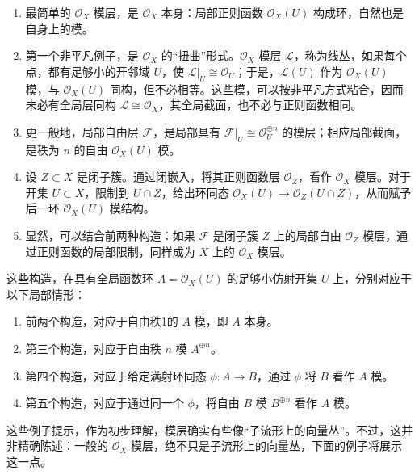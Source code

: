 \begin{example}\label{ex:4.40}
\begin{enumerate}[label=(\arabic*)]
\item 最简单的 $\mathcal{O}_X$ 模层，是 $\mathcal{O}_X$ 本身：局部正则函数 $\mathcal{O}_X(U)$ 构成环，自然也是自身上的模。
\item 第一个非平凡例子，是 $\mathcal{O}_X$ 的“扭曲”形式。$\mathcal{O}_X$ 模层 $\mathcal{L}$，称为线丛，如果每个点，都有足够小的开邻域 $U$，使 $\mathcal{L}|_U\cong\mathcal{O}_U$；于是，$\mathcal{L}(U)$ 作为 $\mathcal{O}_X(U)$ 模，与 $\mathcal{O}_X(U)$ 同构，但不必相等。这些模，可以按非平凡方式粘合，因而未必有全局层同构 $\mathcal{L}\cong\mathcal{O}_X$，其全局截面，也不必与正则函数相同。
\item 更一般地，局部自由层 $\mathcal{F}$，是局部具有 $\mathcal{F}|_U\cong\mathcal{O}_U^{\oplus n}$ 的模层；相应局部截面，是秩为 $n$ 的自由 $\mathcal{O}_X(U)$ 模。
\item 设 $Z\subset X$ 是闭子簇。通过闭嵌入，将其正则函数层 $\mathcal{O}_Z$，看作 $\mathcal{O}_X$ 模层。对于开集 $U\subset X$，限制到 $U\cap Z$，给出环同态 $\mathcal{O}_X(U)\to\mathcal{O}_Z(U\cap Z)$，从而赋予后一环 $\mathcal{O}_X(U)$ 模结构。
\item 显然，可以结合前两种构造：如果 $\mathcal{F}$ 是闭子簇 $Z$ 上的局部自由 $\mathcal{O}_Z$ 模层，通过正则函数的局部限制，同样成为 $X$ 上的 $\mathcal{O}_X$ 模层。
\end{enumerate}
\end{example}

这些构造，在具有全局函数环 $A=\mathcal{O}_X(U)$ 的足够小仿射开集 $U$ 上，分别对应于以下局部情形：
\begin{enumerate}[label=(\arabic*)]
\item 前两个构造，对应于自由秩1的 $A$ 模，即 $A$ 本身。
\item 第三个构造，对应于自由秩 $n$ 模 $A^{\oplus n}$。
\item 第四个构造，对应于给定满射环同态 $\phi\colon A\to B$，通过 $\phi$ 将 $B$ 看作 $A$ 模。
\item 第五个构造，对应于通过同一个 $\phi$，将自由 $B$ 模 $B^{\oplus n}$ 看作 $A$ 模。
\end{enumerate}

这些例子提示，作为初步理解，模层确实有些像“子流形上的向量丛”。不过，这并非精确陈述：一般的 $\mathcal{O}_X$ 模层，绝不只是子流形上的向量丛，下面的例子将展示这一点。

